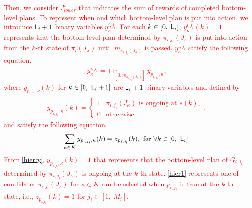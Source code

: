 \documentclass[journal,twoside,web]{IEEEtran}
\newcommand{\req}[1]{\eqref{#1}}
\newcommand{\Len}{{\sf L}}
\newcommand{\G}[1]{\Box_{[#1]}}
\newcommand{\red}[1]{\textcolor{red}{#1}}
\begin{document}
\red{Then, we consider $J_{lower}^i$ that indicates the sum of rewards of completed bottom-level plans.
To represent when and which bottom-level plan is put into action, we introduce $\Len_i + 1$ binary variables ${y}^{i,j_i}_{\kappa}$.
For each $k\in[0,~\Len_i]$, ${y}^{i,j_i}_{\kappa}(k)=1$ represents that the bottom-level plan determined by $\pi_{i,j_i}(J_\kappa)$ is put into action from the $k$-th state of $\pi_i(J_\lambda)$ until $m_{\pi_{i,j_i}(J_\kappa)}$ is passed.
$y^{i,j_i}_{\kappa}$ satisfy the following equation.
\begin{align}
y^{i,j_i}_{\kappa}
=\G{0,m_{\pi_{i,j_i}(J_\kappa)}} y_{p_{i,j_i},\kappa},\label{hier2-1}
\end{align}
where $y_{p_{i,j_i},\kappa}(k)$ for $k\in [0,~\Len_i + 1]$ are $\Len_i + 1$ binary variables and defined by 
\begin{align}\label{hier:y}
y_{p_{i,j_i},\kappa}(k)=\left\{ \begin{array}{ll}
1 & \mbox{$\pi_{i,j_i}(J_\kappa)$ is ongoing at }s(k), \\
0 & \mbox{otherwise.}
\end{array} \right. ,
\end{align}
and satisfy the following equation.
\begin{align}\label{hier1}
\sum_{\kappa\in K}{y}_{p_{i,{j_i}},\kappa}(k) = z_{p_{i,{j_i}}}(k),~\mbox{for }\forall k\in[0,~\Len_i].
\end{align}
From \req{hier:y}, $y_{p_{i,{j_i}},\kappa}(k)=1$ that  represents that the bottom-level plan of $G_{i,{j_i}}$ determined by $\pi_{i,j_i}(J_\kappa)$ is ongoing at the $k$-th state.
\req{hier1} represents one of candidates $\pi_{i,j_i}(J_\kappa)$ for $\kappa\in K$ can be selected when $p_{i,{j_i}}$ is true at the $k$-th state, i.e., $z_{p_{i,{j_i}}}(k)=1$ for $j_i\in[1,~M_i]$.
}
\end{document}
